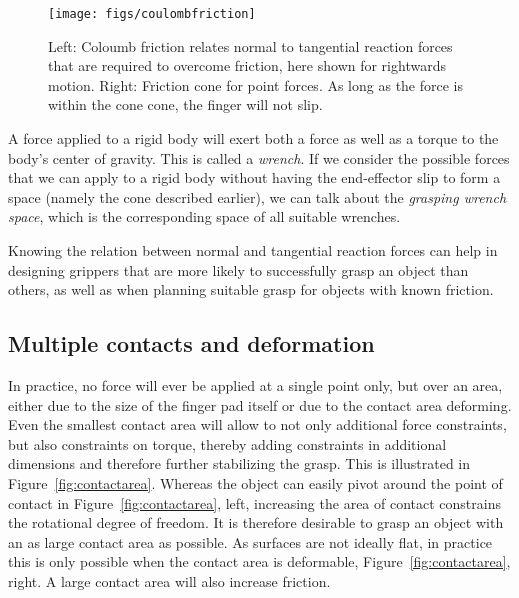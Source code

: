 \begin{figure}
\texttt{[image: figs/coulombfriction]}
\caption{Left: Coloumb friction relates normal to tangential reaction forces that are required to overcome friction, here shown for rightwards motion. Right: Friction cone for point forces. As long as the force is within the cone cone, the finger will not slip.} 
\end{figure}

A force applied to a rigid body will exert both a force as well as a torque to the body's center of gravity. This is called a \emph{wrench}. If we consider the possible forces that we can apply to a rigid body without having the end-effector slip to form a space (namely the cone described earlier), we can talk about the \emph{grasping wrench space}, which is the corresponding space of all suitable wrenches.

Knowing the relation between normal and tangential reaction forces can help in designing grippers that are more likely to successfully grasp an object than others, as well as when planning suitable grasp for objects with known friction.


\subsection{Multiple contacts and deformation}
In practice, no force will ever be applied at a single point only, but over an area, either due to the size of the finger pad itself or due to the contact area deforming. Even the smallest contact area will allow to not only additional force constraints, but also constraints on torque, thereby adding constraints in additional dimensions and therefore further stabilizing the grasp. This is illustrated in Figure~\ref{fig:contactarea}. Whereas the object can easily pivot around the point of contact in Figure~\ref{fig:contactarea}, left, increasing the area of contact constrains the rotational degree of freedom. It is therefore desirable to grasp an object with an as large contact area as possible. As surfaces are not ideally flat, in practice this is only possible when the contact area is deformable, Figure~\ref{fig:contactarea}, right. A large contact area will also increase friction.


